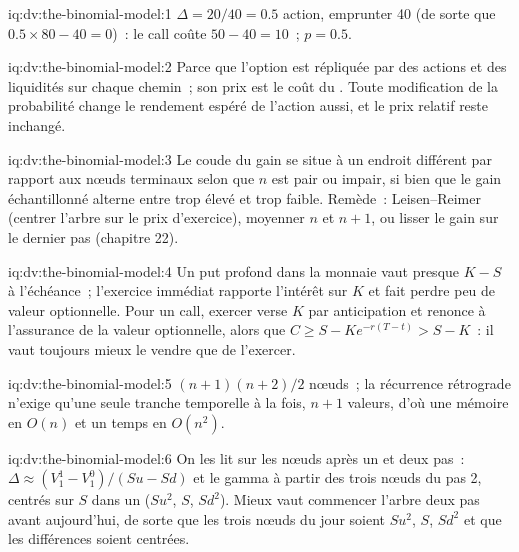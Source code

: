 \begin{solution}{iq:dv:the-binomial-model:1}
$\Delta=20/40=0.5$ action, emprunter 40 (de sorte que $0.5\times80-40=0$)~: le call coûte
$50-40=10$~; $p=0.5$.
\end{solution}

\begin{solution}{iq:dv:the-binomial-model:2}
Parce que l'option est répliquée par des actions et des liquidités sur chaque chemin~; son prix est
le coût du . Toute modification de la probabilité change le
rendement espéré de l'action aussi, et le prix relatif reste inchangé.
\end{solution}

\begin{solution}{iq:dv:the-binomial-model:3}
Le coude du gain se situe à un endroit différent par rapport aux nœuds terminaux
selon que $n$ est pair ou impair, si bien que le gain échantillonné alterne entre trop élevé et trop
faible. Remède~: Leisen--Reimer (centrer l'arbre sur le prix d'exercice), moyenner $n$ et $n+1$,
ou lisser le gain sur le dernier pas (chapitre 22).
\end{solution}

\begin{solution}{iq:dv:the-binomial-model:4}
Un put profond dans la monnaie vaut presque $K-S$ à l'échéance~; l'exercice immédiat rapporte
l'intérêt sur $K$ et fait perdre peu de valeur optionnelle. Pour un call, exercer verse $K$
par anticipation et renonce à l'assurance de la valeur optionnelle, alors que $C\ge S-Ke^{-r(T-t)}>
S-K$~: il vaut toujours mieux le vendre que de l'exercer.
\end{solution}

\begin{solution}{iq:dv:the-binomial-model:5}
$(n+1)(n+2)/2$ nœuds~; la récurrence rétrograde n'exige qu'une seule tranche temporelle à la fois,
$n+1$ valeurs, d'où une mémoire en $O(n)$ et un temps en $O(n^2)$.
\end{solution}

\begin{solution}{iq:dv:the-binomial-model:6}
On les lit sur les nœuds après un et deux pas~: $\Delta\approx(V_1^1-V_1^0)/
(Su-Sd)$ et le gamma à partir des trois nœuds du pas 2, centrés sur $S$ dans un
 ($Su^2$, $S$, $Sd^2$). Mieux vaut commencer l'arbre deux pas
avant aujourd'hui, de sorte que les trois nœuds du jour soient $Su^2$, $S$, $Sd^2$ et que les
différences soient centrées.
\end{solution}
